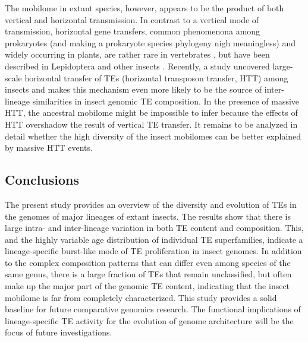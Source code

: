 The mobilome in extant species, however, appears to be the product of
both vertical and horizontal transmission. In contrast to a vertical
mode of transmission, horizontal gene transfers, common phenomenona
among prokaryotes (and making a prokaryote species phylogeny nigh
meaningless) and widely occurring in plants, are rather rare in
vertebrates \citep{Syvanen2012,Wallau2012}, but have been described in Lepidoptera
\citep{Sormacheva2012} and other insects \citep{Nakabachi2015}. Recently, a
study uncovered large-scale horizontal transfer of TEs (horizontal
transposon transfer, HTT) among insects \citep{Peccoud2017} and makes
this mechanism even more likely to be the source of inter-lineage
similarities in insect genomic TE composition. In the presence of
massive HTT, the ancestral mobilome might be impossible to infer because
the effects of HTT overshadow the result of vertical TE transfer. It
remains to be analyzed in detail whether the high diversity of the
insect mobilomes can be better explained by massive HTT events.

\subsection{Conclusions}

The present study provides an overview of the diversity and evolution of TEs in the genomes of major lineages of extant insects.
The results show that there is large intra- and inter-lineage variation in both TE content and composition.
This, and the highly variable age distribution of individual TE superfamilies, indicate a lineage-specific burst-like mode of TE proliferation in insect genomes.
In addition to the complex composition patterns that can differ even among species of the same genus, there is a large fraction of TEs that remain unclassified, but often make up the major part of the genomic TE content, indicating that the insect mobilome is far from completely characterized.
This study provides a solid baseline for future comparative genomics research.
The functional implications of lineage-specific TE activity for the evolution of genome architecture will be the focus of future investigations.
